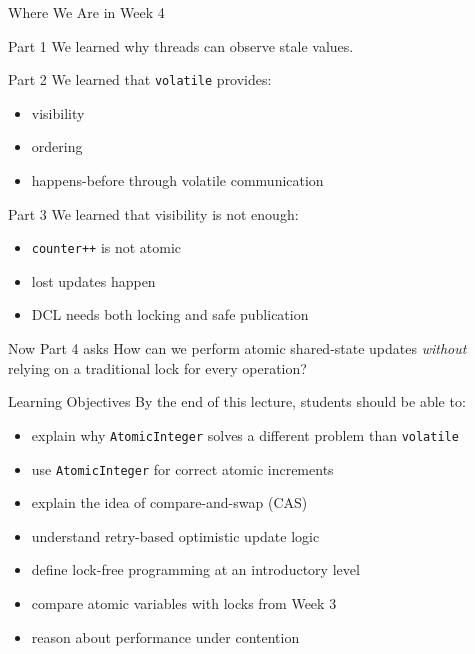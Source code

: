 \documentclass[aspectratio=169,11pt]{beamer}
\begin{document}
	\begin{frame}{Where We Are in Week 4}
		\begin{block}{Part 1}
			We learned why threads can observe stale values.
		\end{block}
		
		\vspace{0.2cm}
		
		\begin{block}{Part 2}
			We learned that \texttt{volatile} provides:
			\begin{itemize}
				\item visibility
				\item ordering
				\item happens-before through volatile communication
			\end{itemize}
		\end{block}
		
		\vspace{0.2cm}
		
		\begin{block}{Part 3}
			We learned that visibility is not enough:
			\begin{itemize}
				\item \texttt{counter++} is not atomic
				\item lost updates happen
				\item DCL needs both locking and safe publication
			\end{itemize}
		\end{block}
		
		\vspace{0.2cm}
		
		\begin{alertblock}{Now Part 4 asks}
			How can we perform atomic shared-state updates \emph{without} relying on a traditional lock for every operation?
		\end{alertblock}
	\end{frame}
	
	\begin{frame}{Learning Objectives}
		By the end of this lecture, students should be able to:
		
		\begin{itemize}
			\item explain why \texttt{AtomicInteger} solves a different problem than \texttt{volatile}
			\item use \texttt{AtomicInteger} for correct atomic increments
			\item explain the idea of compare-and-swap (CAS)
			\item understand retry-based optimistic update logic
			\item define lock-free programming at an introductory level
			\item compare atomic variables with locks from Week 3
			\item reason about performance under contention
		\end{itemize}
	\end{frame}
	
\end{document}
